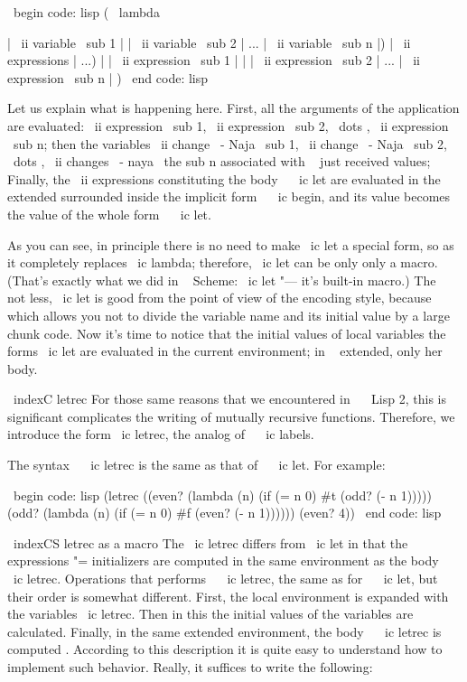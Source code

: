\ begin {code: lisp}
( \ lambda {| \ ii {variable \ sub {1}} | | \ ii {variable \ sub {2}} | ... | \ ii {variable \ sub {n}} |) | \ ii {expressions} | ...)
| | \ ii {expression \ sub {1}} | | | \ ii {expression \ sub {2}} | ... | \ ii {expression \ sub {n}} | )
\ end {code: lisp}

Let us explain what is happening here. First, all the arguments of the application are evaluated:
\ ii {expression \ sub {1}}, \ ii {expression \ sub {2}}, \ dots , \ ii {expression \ sub {n}};
then the variables \ ii {change \ - Naja \ sub {1}}, \ ii {change \ - Naja \ sub {2}}, \ dots ,
\ ii {changes \ - naya \ the sub {n}} associated with ~ just received values;
Finally, the \ ii {expressions} constituting the body ~ \ ic {let} are evaluated in the extended
surrounded inside the implicit form ~ \ ic {begin}, and its value becomes the value
of the whole form ~ \ ic {let}.

As you can see, in principle there is no need to make \ ic {let} a special form, so
as it completely replaces \ ic {lambda}; therefore, \ ic {let} can be only
only a macro. (That's exactly what we did in ~ Scheme: \ ic {let} "--- it's built-in
macro.) The ~ not less, \ ic {let} is good from the point of view of the encoding style, because
which allows you not to divide the variable name and its initial value by a large chunk
code. Now it's time to notice that the initial values ​​of local variables
the forms \ ic {let} are evaluated in the current environment; in ~ extended, only
her body.

\ indexC { letrec }
For those same reasons that we encountered in ~ \ Lisp 2, this is significant
complicates the writing of mutually recursive functions. Therefore, we introduce the form
\ ic {letrec}, the analog of ~ \ ic {labels}.

The syntax ~ \ ic {letrec} is the same as that of ~ \ ic {let}. For example:

\ begin {code: lisp}
(letrec ((even? (lambda (n) (if (= n 0) #t (odd? (- n 1)))))
         (odd? (lambda (n) (if (= n 0) #f (even? (- n 1))))))
  (even? 4))
\ end {code: lisp}

\ indexCS { letrec } {as a macro}
The \ ic {letrec} differs from \ ic {let} in that the expressions "= initializers
are computed in the same environment as the body ~ \ ic {letrec}. Operations that
performs ~ \ ic {letrec}, the same as for ~ \ ic {let}, but their order is somewhat different.
First, the local environment is expanded with the variables \ ic {letrec}. Then in this
the initial values ​​of the variables are calculated. Finally,
in the same extended environment, the body ~ \ ic {letrec} is computed . According to this description
it is quite easy to understand how to implement such behavior. Really,
it suffices to write the following:

}
